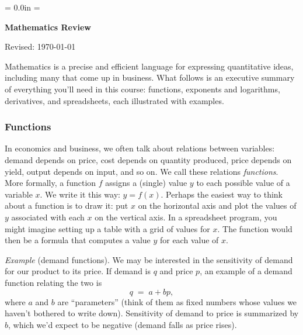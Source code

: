 \documentclass[letterpaper,12pt]{article}
\begin{document}
\parindent = 0.0in
\parskip = \bigskipamount
\thispagestyle{empty}%
\Head

\centerline{\large \bf Mathematics Review}%
\centerline{Revised:  \today}

\bigskip
Mathematics is a precise and efficient language for expressing quantitative ideas,
including many that come up in business.
What follows is an executive summary of everything you'll need in this course:
functions, exponents and logarithms, derivatives, and spreadsheets,
each illustrated with examples.


\subsubsection*{Functions}

In economics and business, we often talk about relations between
variables: demand depends on price, cost depends on quantity
produced, price depends on yield, output depends on input, and so
on. We call these relations {\it functions\/}. More formally, a
function $f$ assigns a (single) value $y$ to each possible value
of a variable $x$.
We write it this way: $y = f(x)$. Perhaps the
easiest way to think about a function is to draw it: put $x$ on
the horizontal axis and plot the values of $y$ associated with
each $x$ on the vertical axis. In a spreadsheet program, you might
imagine setting up a table with a grid of values for $x$. The
function would then be a formula that computes a value $y$ for
each value of $x$.



{\it Example} (demand functions).
We may be interested in the sensitivity of demand for our product to its price.
If demand is $q$ and price $p$,
an example of a  demand function relating the two is
\[
    q \;=\; a + b p ,
\]
where $a$ and $b$ are ``parameters''
(think of them as fixed numbers whose values we haven't bothered to write down).
Sensitivity of demand to price is summarized by $b$,
which we'd expect to be negative (demand falls as price rises).
\end{document}
